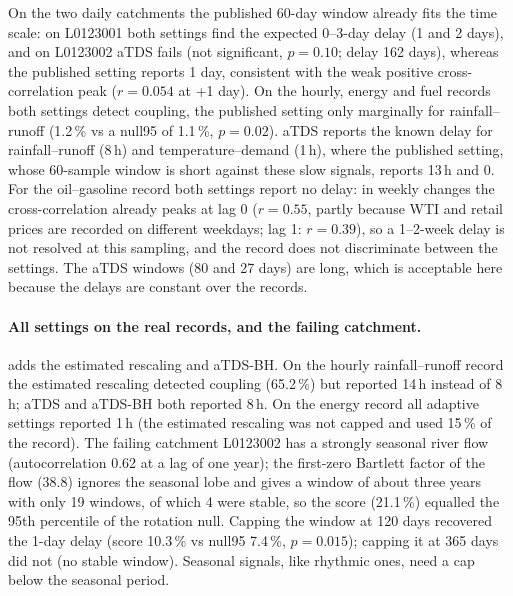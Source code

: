 \documentclass[11pt,a4paper]{article}
\begin{document}
On the two daily catchments the published 60-day window already fits the time scale: on L0123001 both settings find the expected 0--3-day delay (1 and 2 days), and on L0123002 aTDS fails (not significant, $p = 0.10$; delay 162 days), whereas the published setting reports 1 day, consistent with the weak positive cross-correlation peak ($r = 0.054$ at +1 day). On the hourly, energy and fuel records both settings detect coupling, the published setting only marginally for rainfall--runoff (1.2\,\% vs a null95 of 1.1\,\%, $p = 0.02$). aTDS reports the known delay for rainfall--runoff (8\,h) and temperature--demand (1\,h), where the published setting, whose 60-sample window is short against these slow signals, reports 13\,h and 0. For the oil--gasoline record both settings report no delay: in weekly changes the cross-correlation already peaks at lag 0 ($r = 0.55$, partly because WTI and retail prices are recorded on different weekdays; lag 1: $r = 0.39$), so a 1--2-week delay is not resolved at this sampling, and the record does not discriminate between the settings. The aTDS windows (80 and 27 days) are long, which is acceptable here because the delays are constant over the records.

\paragraph{All settings on the real records, and the failing catchment.}  adds the estimated rescaling and aTDS-BH. On the hourly rainfall--runoff record the estimated rescaling detected coupling (65.2\,\%) but reported 14\,h instead of 8\,h; aTDS and aTDS-BH both reported 8\,h. On the energy record all adaptive settings reported 1\,h (the estimated rescaling was not capped and used 15\,\% of the record). The failing catchment L0123002 has a strongly seasonal river flow (autocorrelation 0.62 at a lag of one year); the first-zero Bartlett factor of the flow (38.8) ignores the seasonal lobe and gives a window of about three years with only 19 windows, of which 4 were stable, so the score (21.1\,\%) equalled the 95th percentile of the rotation null. Capping the window at 120 days recovered the 1-day delay (score 10.3\,\% vs null95 7.4\,\%, $p = 0.015$); capping it at 365 days did not (no stable window). Seasonal signals, like rhythmic ones, need a cap below the seasonal period.


\end{document}
